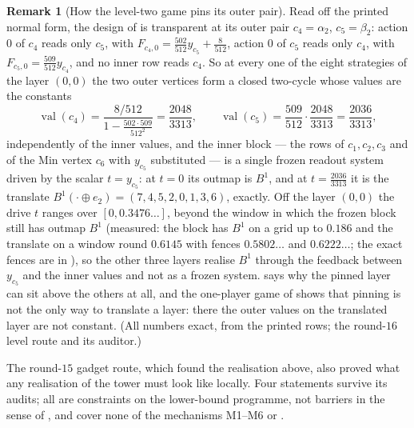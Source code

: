 \documentclass[11pt]{article}
\theoremstyle{plain}
\theoremstyle{definition}
\newtheorem{remark}[theorem]{Remark}
\DeclareMathOperator{\val}{val}
\begin{document}
\begin{remark}[How the level-two game pins its outer pair]\label{rem:b2-anatomy}
Read off the printed normal form, the design of 
is transparent at its outer pair $c_4=\alpha_2$, $c_5=\beta_2$: action
$0$ of $c_4$ reads only $c_5$, with $F_{c_4,0}=\tfrac{502}{512}y_{c_5}+\tfrac8{512}$,
action $0$ of $c_5$ reads only $c_4$, with $F_{c_5,0}=\tfrac{509}{512}y_{c_4}$,
and no inner row reads $c_4$. So at every one of the eight strategies of
the layer $(0,0)$ the two outer vertices form a closed two-cycle whose
values are the constants
\[
  \val(c_4)=\frac{8/512}{1-\frac{502\cdot509}{512^{2}}}=\frac{2048}{3313},\qquad
  \val(c_5)=\frac{509}{512}\cdot\frac{2048}{3313}=\frac{2036}{3313},
\]
independently of the inner values, and the inner block --- the rows of
$c_1,c_2,c_3$ and of the Min vertex $c_6$ with $y_{c_5}$ substituted ---
is a single frozen readout system driven by the scalar $t=y_{c_5}$: at
$t=0$ its outmap is $B^{1}$, and at $t=\tfrac{2036}{3313}$ it is the
translate $B^{1}(\cdot\oplus e_2)=(7,4,5,2,0,1,3,6)$, exactly. Off the
layer $(0,0)$ the drive $t$ ranges over $[0,0.3476\ldots]$, beyond the
window in which the frozen block still has outmap $B^{1}$ (measured: the
block has $B^{1}$ on a grid up to $0.186$ and the translate on a window
round $0.6145$ with fences $0.5802\ldots$ and $0.6222\ldots$; the exact
fences are in ), so the other
three layers realise $B^{1}$ through the feedback between $y_{c_5}$ and
the inner values and not as a frozen system.  says
why the pinned layer can sit above the others at all, and the one-player
game of  shows that pinning is not the only way to
translate a layer: there the outer values on the translated layer are
not constant. (All numbers exact, from the printed rows; the round-$16$
level route and its auditor.)
\end{remark}

The round-$15$ gadget route, which found the realisation above, also
proved what any realisation of the tower must look like locally. Four
statements survive its audits; all are constraints on the lower-bound
programme, not barriers in the sense of , and cover none of
the mechanisms M1--M6 or .
\end{document}
